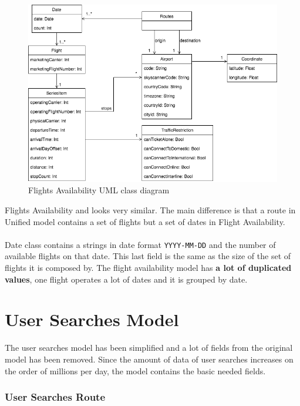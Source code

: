 \begin{figure}[H]
\centering
\includegraphics[scale=0.6]{diagrams/flights_availability_model.png}
\caption{Flights Availability UML class diagram}
\end{figure}

Flights Availability and  looks very similar. The main difference is that a route in Unified model contains a set of flights but a set of dates in Flight Availability.
\\\\
Date class contains a strings in date format \texttt{YYYY-MM-DD} and the number of available flights on that date. This last field is the same as the size of the set of flights it is composed by. The flight availability model has \textbf{a lot of duplicated values}, one flight operates a lot of dates and it is grouped by date.


\section{User Searches Model}

The user searches model has been simplified and a lot of fields from the original model has been removed. Since the amount of data of user searches increases on the order of millions per day, the model contains the basic needed fields.

\subsubsection*{User Searches Route}

